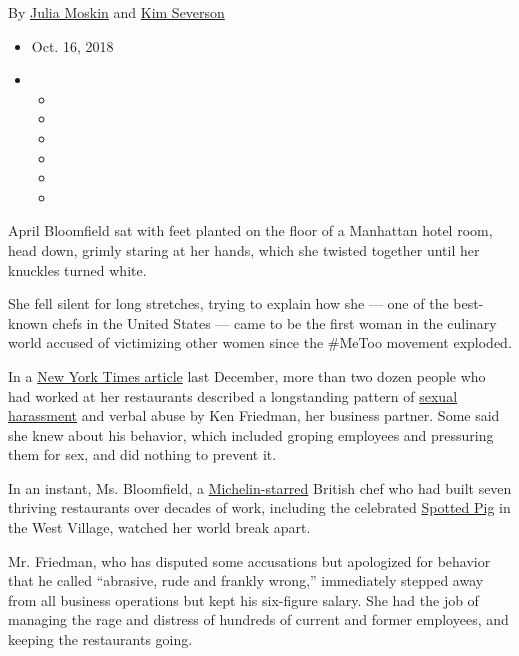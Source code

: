 By \href{https://www.nytimes.com/by/julia-moskin}{Julia Moskin} and
\href{https://www.nytimes.com/by/kim-severson}{Kim Severson}

\begin{itemize}
\item
  Oct. 16, 2018
\item
  \begin{itemize}
  \item
  \item
  \item
  \item
  \item
  \item
  \end{itemize}
\end{itemize}

April Bloomfield sat with feet planted on the floor of a Manhattan hotel
room, head down, grimly staring at her hands, which she twisted together
until her knuckles turned white.

She fell silent for long stretches, trying to explain how she --- one of
the best-known chefs in the United States --- came to be the first woman
in the culinary world accused of victimizing other women since the
\#MeToo movement exploded.

In a
\href{https://www.nytimes.com/2017/12/12/dining/ken-friedman-sexual-harassment.html}{New
York Times article} last December, more than two dozen people who had
worked at her restaurants described a longstanding pattern of
\href{https://www.nytimes.com/2018/08/20/dining/mario-batali-spotted-pig.html}{sexual
harassment} and verbal abuse by Ken Friedman, her business partner. Some
said she knew about his behavior, which included groping employees and
pressuring them for sex, and did nothing to prevent it.

In an instant, Ms. Bloomfield, a
\href{https://guide.michelin.com/us/new-york/spotted-pig/restaurant}{Michelin-starred}
British chef who had built seven thriving restaurants over decades of
work, including the celebrated
\href{https://www.thespottedpig.com/\#home}{Spotted Pig} in the West
Village, watched her world break apart.

Mr. Friedman, who has disputed some accusations but apologized for
behavior that he called ``abrasive, rude and frankly wrong,''
immediately stepped away from all business operations but kept his
six-figure salary. She had the job of managing the rage and distress of
hundreds of current and former employees, and keeping the restaurants
going.

